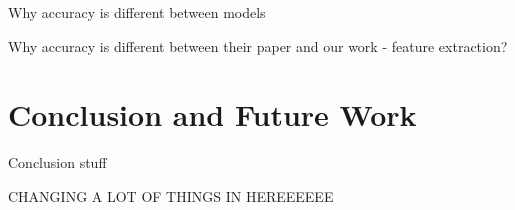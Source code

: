 \documentclass[11pt,a4paper]{article}
\begin{document}
Why accuracy is different between models

Why accuracy is different between their paper and our work - feature extraction?

\section{Conclusion and Future Work}
Conclusion stuff

CHANGING A LOT OF THINGS IN HEREEEEEE



%
%
%
%
\end{document}
